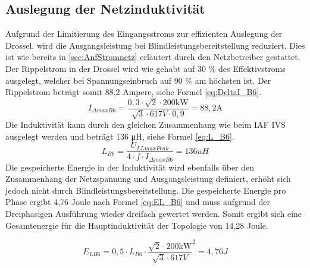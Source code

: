 		\subsection{Auslegung der Netzinduktivität}
			Aufgrund der Limitierung des Eingangsstroms zur effizienten Auslegung der Drossel, wird die Ausgangsleistung bei Blindleistungsbereitstellung reduziert. Dies ist wie bereits in \ref{sec:AnfStromnetz} erläutert durch den Netzbetreiber gestattet. Der Rippelstrom in der Drossel wird wie gehabt auf 30 \% des Effektivstroms ausgelegt, welcher bei Spannungseinbruch auf 90 \% am höchsten ist. Der Rippelstrom beträgt somit 88,2 Ampere, siehe Formel \ref{eq:DeltaI_B6}.\\
			
			\begin{equation}
				\label{eq:DeltaI_B6}
				I_{\Delta max B6}= \dfrac{0,3\cdot \sqrt{2} \cdot 200 \si{\kilo \watt}}{\sqrt{3} \cdot 617 \si{V} \cdot 0,9} = 88,2 \si{\A}
			\end{equation}
			Die Induktivität kann durch den gleichen Zusammenhang wie beim \gls{IAF} \gls{IVS} ausgelegt werden und beträgt 136 \si{\micro \henry}, siehe Formel \ref{eq:L_B6}.
			\begin{equation}
				\label{eq:L_B6}
				L_{B6}= \dfrac{U_{LLmaxPeak}}{4\cdot f \cdot I_{\Delta max B6}} = 136 uH
			\end{equation}
			Die gespeicherte Energie in der Induktivität wird ebenfalls über den Zusammenhang der Netzspannung und Ausgangsleistung definiert, erhöht sich jedoch nicht durch Blindleistungsbereitstellung. Die gespeicherte Energie pro Phase ergibt 4,76 Joule nach Formel \ref{eq:EL_B6} und muss aufgrund der Dreiphasigen Ausführung wieder dreifach gewertet werden. Somit ergibt sich eine Gesamtenergie für die Hauptinduktivität der Topologie von 14,28 Joule.
			
			\begin{equation}
			\label{eq:EL_B6}
			E_{LB6}=0,5 \cdot L_{B6} \cdot {\dfrac{\sqrt{2} \cdot 200 \si{\kilo \watt} }{\sqrt{3} \cdot 617 V}}^{2} = 4,76 J
			\end{equation}
			
			

		
